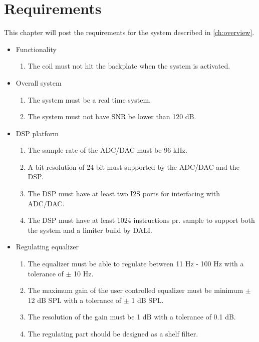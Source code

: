\chapter{Requirements}
This chapter will post the requirements for the system described in \autoref{ch:overview}.  

\begin{itemize}
\item Functionality
\begin{enumerate}
\item The coil must not hit the backplate when the system is activated.
\end{enumerate}
\end{itemize}

\begin{itemize}
\item Overall system
\begin{enumerate}
\item The system must be a real time system. 
\item The system must not have SNR be lower than 120 dB.
\end{enumerate}
\end{itemize}

\begin{itemize}
\item DSP platform
\begin{enumerate}
\item The sample rate of the ADC/DAC must be 96 kHz.
\item A bit resolution of 24 bit must supported by the ADC/DAC and the DSP.
\item The DSP must have at least two \gls{I2S} ports for interfacing with ADC/DAC.
\item The DSP must have at least 1024 instructions pr. sample to support both the system and a limiter build by DALI. 
\end{enumerate}
\end{itemize}

\begin{itemize}
\item Regulating equalizer
\begin{enumerate}
\item The equalizer must be able to regulate between 11 Hz - 100 Hz with a tolerance of $\pm$ 10 Hz. 
\item The maximum gain of the user controlled equalizer must be minimum $\pm$ 12 dB SPL with a tolerance of $\pm$ 1 dB SPL.
\item The resolution of the gain must be 1 dB with a tolerance of 0.1 dB.
\item The regulating part should be designed as a shelf filter.
\end{enumerate}
\end{itemize}


